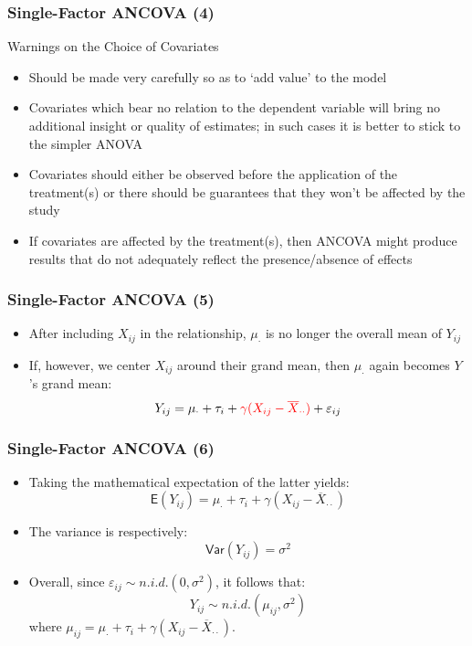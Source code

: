 \documentclass[10pt]{beamer}
\theoremstyle{definition}
\begin{document}
\begin{frame}[fragile]
\frametitle{Single-Factor ANCOVA (4)}
Warnings on the Choice of Covariates
\begin{itemize}
	\item Should be made very carefully so as to `add value' to the model
	\item Covariates which bear no relation to the dependent variable will bring no additional insight or quality of estimates; in such cases it is better to stick to the simpler ANOVA 
	\item Covariates should either be observed before the application of the treatment(s) or there should be guarantees that they won't be affected by the study
	\item If covariates are affected by the treatment(s), then ANCOVA might produce results that do not adequately reflect the presence/absence of effects
\end{itemize}
\end{frame}

\begin{frame}[fragile]
\frametitle{Single-Factor ANCOVA (5)}
\begin{itemize}
	\item After including $X_{ij}$ in the relationship, $\mu_{\cdot}$ is no longer the overall mean of $Y_{ij}$
	\item If, however, we center $X_{ij}$ around their grand mean, then $\mu_{\cdot}$ again becomes $Y$'s grand mean:
	\[
		Y_{ij} = \mu_{\cdot} + \tau_{i} + \textcolor{red}{\gamma (X_{ij} - \overline{X}_{\cdot\cdot})} + \varepsilon_{ij}
	\]
\end{itemize}
\end{frame}

\begin{frame}[fragile]
\frametitle{Single-Factor ANCOVA (6)}
\begin{itemize}
	\item Taking the mathematical expectation of the latter yields:
	\[
		\mathsf{E}(Y_{ij}) = \mu_{\cdot} + \tau_{i} + \gamma (X_{ij} - \overline{X}_{\cdot\cdot})
	\]
	\item The variance is respectively:
	\[
		\mathsf{Var}(Y_{ij}) = \sigma^{2}
	\]
	\item Overall, since $\varepsilon_{ij} \sim n.i.d. (0, \sigma^{2})$, it follows that:
	\[
		Y_{ij} \sim n.i.d.(\mu_{ij}, \sigma^{2})
	\]
	where $\mu_{ij} = \mu_{\cdot} + \tau_{i} + \gamma (X_{ij} - \overline{X}_{\cdot\cdot})$.
\end{itemize}
\end{frame}
\end{document}
